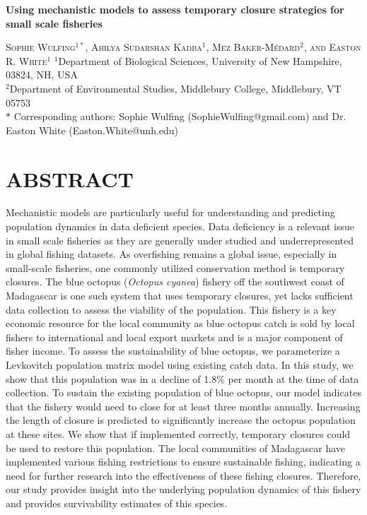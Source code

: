 \documentclass[
]{article}
\author{}
\date{\vspace{-2.5em}}
\begin{document}
\setcounter{page}{6}

\begin{center}
    
\textbf{\Large Using mechanistic models to assess temporary closure strategies for small scale fisheries}
    
\textsc{Sophie Wulfing$^{1*}$, Ahilya Sudarshan Kadba$^{1}$, Mez Baker-Médard$^{2}$, and Easton R. White$^{1}$}
\vspace{3 mm}
\normalsize{\indent $^1$Department of Biological Sciences, University of New Hampshire, 03824, NH, USA \\ $^2$Department of Environmental Studies, Middlebury College, Middlebury, VT 05753\\}
$\text{*}$ Corresponding authors: Sophie Wulfing (SophieWulfing@gmail.com) and Dr. Easton White (Easton.White@unh.edu)
\end{center}

\newpage

\linenumbers

\hypertarget{abstract}{%
\section{ABSTRACT}\label{abstract}}

Mechanistic models are particularly useful for understanding and predicting population dynamics in data deficient species. Data deficiency is a relevant issue in small scale fisheries as they are generally under studied and underrepresented in global fishing datasets. As overfishing remains a global issue, especially in small-scale fisheries, one commonly utilized conservation method is temporary closures. The blue octopus (\emph{Octopus cyanea}) fishery off the southwest coast of Madagascar is one such system that uses temporary closures, yet lacks sufficient data collection to assess the viability of the population. This fishery is a key economic resource for the local community as blue octopus catch is sold by local fishers to international and local export markets and is a major component of fisher income. To assess the sustainability of blue octopus, we parameterize a Levkovitch population matrix model using existing catch data. In this study, we show that this population was in a decline of 1.8\% per month at the time of data collection. To sustain the existing population of blue octopus, our model indicates that the fishery would need to close for at least three months annually. Increasing the length of closure is predicted to significantly increase the octopus population at these sites. We show that if implemented correctly, temporary closures could be used to restore this population. The local communities of Madagascar have implemented various fishing restrictions to ensure sustainable fishing, indicating a need for further research into the effectiveness of these fishing closures. Therefore, our study provides insight into the underlying population dynamics of this fishery and provides survivability estimates of this species.
\end{document}
